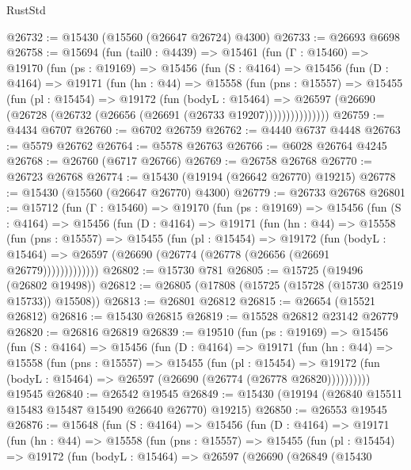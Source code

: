 \begin{lexlean}{RustStd}
\begin{coremodule}
@26732 := @15430 (@15560 (@26647 @26724) @4300)
@26733 := @26693 @6698
@26758 := @15694
    (fun (tail0 : @4439) =>
    @15461
      (fun (Γ : @15460) =>
      @19170
        (fun (ps : @19169) =>
        @15456
          (fun (S : @4164) =>
          @15456
            (fun (D : @4164) =>
            @19171
              (fun (hn : @44) =>
              @15558
                (fun (pns : @15557) =>
                @15455
                  (fun (pl : @15454) =>
                  @19172
                    (fun (bodyL : @15464) =>
                    @26597 (@26690 (@26728 (@26732 (@26656 (@26691 (@26733 @19207)))))))))))))))
@26759 := @4434 @6707
@26760 := @6702 @26759
@26762 := @4440 @6737 @4448
@26763 := @5579 @26762
@26764 := @5578 @26763
@26766 := @6028 @26764 @4245
@26768 := @26760 (@6717 @26766)
@26769 := @26758 @26768
@26770 := @26723 @26768
@26774 := @15430 (@19194 (@26642 @26770) @19215)
@26778 := @15430 (@15560 (@26647 @26770) @4300)
@26779 := @26733 @26768
@26801 := @15712
    (fun (Γ : @15460) =>
    @19170
      (fun (ps : @19169) =>
      @15456
        (fun (S : @4164) =>
        @15456
          (fun (D : @4164) =>
          @19171
            (fun (hn : @44) =>
            @15558
              (fun (pns : @15557) =>
              @15455
                (fun (pl : @15454) =>
                @19172
                  (fun (bodyL : @15464) =>
                  @26597 (@26690 (@26774 (@26778 (@26656 (@26691 @26779)))))))))))))
@26802 := @15730 @781
@26805 := @15725 (@19496 (@26802 @19498))
@26812 := @26805 (@17808 (@15725 (@15728 (@15730 @2519 @15733)) @15508))
@26813 := @26801 @26812
@26815 := @26654 (@15521 @26812)
@26816 := @15430 @26815
@26819 := @15528 @26812 @23142 @26779
@26820 := @26816 @26819
@26839 := @19510
    (fun (ps : @19169) =>
    @15456
      (fun (S : @4164) =>
      @15456
        (fun (D : @4164) =>
        @19171
          (fun (hn : @44) =>
          @15558
            (fun (pns : @15557) =>
            @15455
              (fun (pl : @15454) =>
              @19172 (fun (bodyL : @15464) => @26597 (@26690 (@26774 (@26778 @26820))))))))))
    @19545
@26840 := @26542 @19545
@26849 := @15430 (@19194 (@26840 @15511 @15483 @15487 @15490 @26640 @26770) @19215)
@26850 := @26553 @19545
@26876 := @15648
    (fun (S : @4164) =>
    @15456
      (fun (D : @4164) =>
      @19171
        (fun (hn : @44) =>
        @15558
          (fun (pns : @15557) =>
          @15455
            (fun (pl : @15454) =>
            @19172
              (fun (bodyL : @15464) =>
              @26597
                (@26690
                  (@26849
                    (@15430

\end{coremodule}
\end{lexlean}
